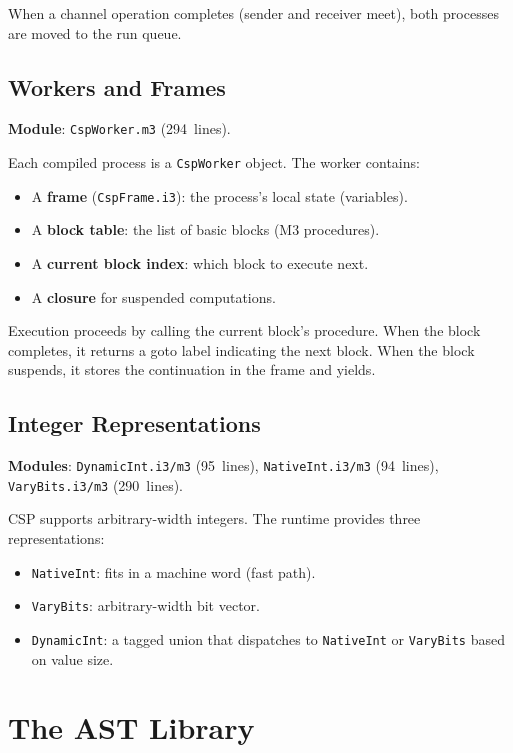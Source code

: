 \documentclass[11pt,letterpaper]{article}
\begin{document}
When a channel operation completes (sender and receiver meet), both
processes are moved to the run queue.

\subsection{Workers and Frames}

\textbf{Module}: \texttt{CspWorker.m3} (294~lines).

Each compiled process is a \texttt{CspWorker} object.  The worker
contains:
\begin{itemize}[nosep]
  \item A \textbf{frame} (\texttt{CspFrame.i3}): the process's local
    state (variables).
  \item A \textbf{block table}: the list of basic blocks (M3 procedures).
  \item A \textbf{current block index}: which block to execute next.
  \item A \textbf{closure} for suspended computations.
\end{itemize}

Execution proceeds by calling the current block's procedure.  When
the block completes, it returns a goto label indicating the next
block.  When the block suspends, it stores the continuation in
the frame and yields.

\subsection{Integer Representations}

\textbf{Modules}: \texttt{DynamicInt.i3/m3} (95~lines),
\texttt{NativeInt.i3/m3} (94~lines), \texttt{VaryBits.i3/m3}
(290~lines).

CSP supports arbitrary-width integers.  The runtime provides three
representations:
\begin{itemize}[nosep]
  \item \texttt{NativeInt}: fits in a machine word (fast path).
  \item \texttt{VaryBits}: arbitrary-width bit vector.
  \item \texttt{DynamicInt}: a tagged union that dispatches to
    \texttt{NativeInt} or \texttt{VaryBits} based on value size.
\end{itemize}


\section{The AST Library}
\label{sec:ast}
\end{document}
